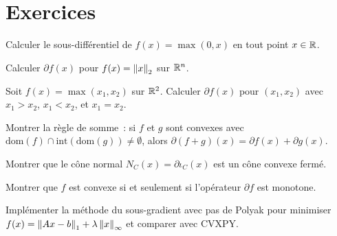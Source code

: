 \section{Exercices}

\begin{exercice}[$\star$]
Calculer le sous-diff\'erentiel de $f(x) = \max(0, x)$ en tout point $x \in \mathbb{R}$.
\end{exercice}

\begin{exercice}[$\star$]
Calculer $\partial f(x)$ pour $f(x) = \left\| x \right\|_2$ sur $\mathbb{R}^n$.
\end{exercice}

\begin{exercice}[$\star\star$]
Soit $f(x) = \max(x_1, x_2)$ sur $\mathbb{R}^2$. Calculer $\partial f(x)$ pour
$(x_1, x_2)$ avec $x_1 > x_2$, $x_1 < x_2$, et $x_1 = x_2$.
\end{exercice}

\begin{exercice}[$\star\star$]
Montrer la r\`egle de somme~: si $f$ et $g$ sont convexes avec
$\mathrm{dom}(f) \cap \mathrm{int}(\mathrm{dom}(g)) \neq \emptyset$,
alors $\partial(f+g)(x) = \partial f(x) + \partial g(x)$.
\end{exercice}

\begin{exercice}[$\star\star$]
Montrer que le c\^one normal $N_C(x) = \partial \iota_C(x)$ est un c\^one convexe ferm\'e.
\end{exercice}

\begin{exercice}[$\star\star\star$]
Montrer que $f$ est convexe si et seulement si l'op\'erateur $\partial f$ est monotone.
\end{exercice}

\begin{exercice}[$\star\star\star$]
Impl\'ementer la m\'ethode du sous-gradient avec pas de Polyak pour minimiser
$f(x) = \left\| Ax - b \right\|_1 + \lambda\left\| x \right\|_\infty$ et comparer avec CVXPY.
\end{exercice}
